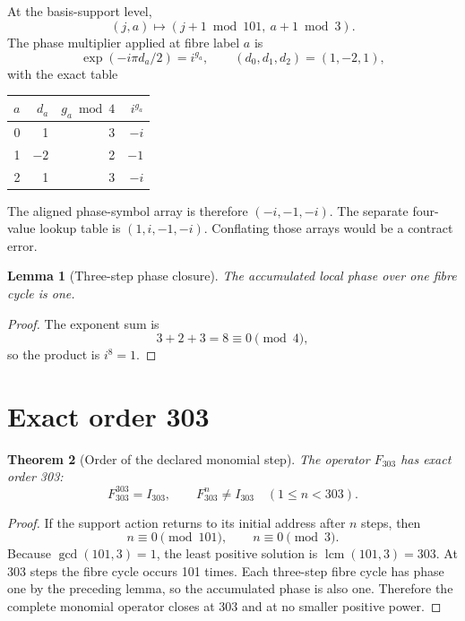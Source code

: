 \documentclass[11pt,a4paper]{article}
\newtheorem{theorem}{Theorem}
\newtheorem{lemma}[theorem]{Lemma}
\theoremstyle{definition}
\newcommand{\Fthree}{F_{303}}
\begin{document}
At the basis-support level,
\begin{equation}
(j,a)\longmapsto(j+1\bmod101,\ a+1\bmod3).
\end{equation}
The phase multiplier applied at fibre label $a$ is
\begin{equation}
\exp(-i\pi d_a/2)=i^{g_a},
\qquad
(d_0,d_1,d_2)=(1,-2,1),
\end{equation}
with the exact table
\begin{center}
\begin{tabular}{@{}rrrr@{}}
\toprule
$a$ & $d_a$ & $g_a\bmod4$ & $i^{g_a}$ \\
\midrule
0 & 1 & 3 & $-i$ \\
1 & $-2$ & 2 & $-1$ \\
2 & 1 & 3 & $-i$ \\
\bottomrule
\end{tabular}
\end{center}
The aligned phase-symbol array is therefore $(-i,-1,-i)$. The separate four-value lookup table is $(1,i,-1,-i)$. Conflating those arrays would be a contract error.

\begin{lemma}[Three-step phase closure]
The accumulated local phase over one fibre cycle is one.
\end{lemma}
\begin{proof}
The exponent sum is
\begin{equation}
3+2+3=8\equiv0\pmod4,
\end{equation}
so the product is $i^8=1$.
\end{proof}

\section{Exact order 303}
\begin{theorem}[Order of the declared monomial step]
The operator $\Fthree$ has exact order 303:
\begin{equation}
\Fthree^{303}=I_{303},
\qquad
\Fthree^n\ne I_{303}\quad(1\le n<303).
\end{equation}
\end{theorem}
\begin{proof}
If the support action returns to its initial address after $n$ steps, then
\begin{equation}
n\equiv0\pmod{101},
\qquad
n\equiv0\pmod3.
\end{equation}
Because $\gcd(101,3)=1$, the least positive solution is
$\operatorname{lcm}(101,3)=303$. At 303 steps the fibre cycle occurs 101 times. Each three-step fibre cycle has phase one by the preceding lemma, so the accumulated phase is also one. Therefore the complete monomial operator closes at 303 and at no smaller positive power.
\end{proof}
\end{document}
